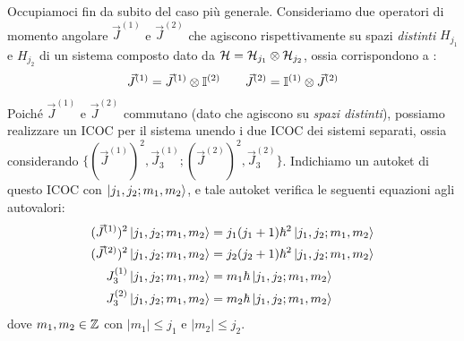 \documentclass[../../FisicaTeorica.tex]{subfiles}
\begin{document}
Occupiamoci fin da subito del caso più generale. Consideriamo due operatori di momento angolare $\vec{J}^{(1)}$ e $\vec{J}^{(2)}$ che agiscono rispettivamente su spazi \textit{distinti} $H_{j_1}$ e $H_{j_2}$ di un sistema composto dato da $\mathcal{H}=\mathcal{H}_{j_1} \otimes \mathcal{H}_{j_2}$, ossia corrispondono a :
\begin{align*}
\vec{J}^{(1)}=\vec{J}^{(1)}\otimes \mathbb{I}^{(2)}\qquad \vec{J}^{(2)}=\mathbb{I}^{(1)}\otimes \vec{J}^{(2)}
\end{align*}
Poiché $\vec{J}^{(1)}$ e $\vec{J}^{(2)}$ commutano (dato che agiscono su \textit{spazi distinti}), possiamo realizzare un ICOC per il sistema unendo i due ICOC dei sistemi separati, ossia considerando $\{(\vec{J}^{(1)})^2, \vec{J}_3^{(1)}; (\vec{J}^{(2)})^2, \vec{J}_3^{(2)} \}$. Indichiamo un autoket di questo ICOC con $\Ket{j_1, j_2; m_1, m_2}$, e tale autoket verifica le seguenti equazioni agli autovalori:
\begin{align*}
(\vec{J}^{(1)})^2 \Ket{j_1, j_2; m_1, m_2} &= j_1(j_1 +1)\hbar^2 \Ket{j_1, j_2; m_1, m_2}\\
(\vec{J}^{(2)})^2 \Ket{j_1, j_2; m_1, m_2} &= j_2(j_2+1)\hbar^2 \Ket{j_1, j_2; m_1, m_2}\\
{J}^{(1)}_3 \Ket{j_1, j_2;m_1, m_2} &= m_1\hbar \Ket{j_1, j_2; m_1, m_2}\\
{J}^{(2)}_3 \Ket{j_1, j_2; m_1, m_2} &= m_2\hbar \Ket{j_1, j_2;m_1, m_2}
\end{align*}
dove $m_1, m_2 \in \mathbb{Z}$ con $|m_1| \leq j_1$ e $|m_2| \leq j_2$.\\
\end{document}
